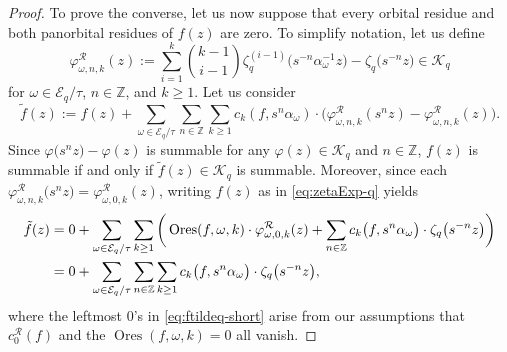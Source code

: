 \documentclass[preprint,12pt]{elsarticle}
\numberwithin{equation}{section} %
\theoremstyle{theorem}
\theoremstyle{definition}
\newcommand{\bk}{\mathcal{K}} %
\newcommand{\bkq}{\bk_{q}} %
\newcommand{\ec}{\mathcal{E}} %
\newcommand{\ecq}{\ec_{q}}
\newcommand{\orbitq}{{\ecq/\tau}} %
\newcommand{\Z}{\mathbb{Z}} %
\newcommand{\zq}{\zeta_{q}}
\newcommand{\zqd}[1]{\zq^{({#1})}} %
\DeclareMathOperator{\ores}{Ores}
\begin{document}
\begin{proof}
    To prove the converse, let us now suppose that every orbital residue and both panorbital residues of $f(z)$ are zero. To simplify notation, let us define \begin{equation}\label{eq:phiq}\varphi^\mathcal{R}_{\omega,n,k}(z):=\sum_{i=1}^k\binom{k-1}{i-1}\zqd{i-1}\bigl(s^{-n}\alpha_\omega^{-1}z\bigr) - \zq\bigl(s^{-n}z\bigr)\in\bkq\end{equation} for $\omega\in\orbitq$, $n\in\mathbb{Z}$, and $k\geq 1$. Let us consider 
    \begin{equation}\tilde{f}(z):=f(z)+\sum_{\omega\in\orbitq}\sum_{n\in\Z}\sum_{k\geq 1}c_k(f,s^{n}\alpha_\omega)\cdot\bigl(\varphi^\mathcal{R}_{\omega,n,k}(s^nz)-\varphi^\mathcal{R}_{\omega,n,k}(z)\bigr).\label{eq:ftildeq-def}
    \end{equation}
    Since $\varphi\bigl( s^nz\bigr)-\varphi(z)$ is summable for any $\varphi(z)\in\bkq$ and $n\in\mathbb{Z}$, $f(z)$ is summable if and only if $\tilde{f}(z)\in\bkq$ is summable. Moreover, since each $\varphi_{\omega,n,k}^{\mathcal{R}}\bigl(s^nz\bigr) = \varphi_{\omega,0,k}^{\mathcal{R}}(z)$, writing $f(z)$ as in \eqref{eq:zetaExp-q} yields 
    \begin{align}
    \tilde{f}(z)&=0+\sum_{\omega\in\orbitq}\sum_{k\geq 1}\bigg(\ores(f,\omega,k)\cdot\varphi_{\omega,0,k}^\mathcal{R}(z)  +\sum_{n\in\mathbb{Z}}c_k\bigl(f,s^n\alpha_\omega\bigr)\cdot\zq\bigl(s^{-n}z\bigr)\bigg) \notag\\
    &=0+\sum_{\omega\in\orbitq}\sum_{n\in\mathbb{Z}}\sum_{k\geq 1}c_k\bigl(f,s^n\alpha_\omega\bigr)\cdot\zq\bigl(s^{-n}z\big),\label{eq:ftildeq-short}\end{align} where the leftmost $0$'s in \eqref{eq:ftildeq-short} arise from our assumptions that $c_0^\mathcal{R}(f)$ and the $\ores(f,\omega,k)=0$ all vanish.
    

\end{proof}
\end{document}
